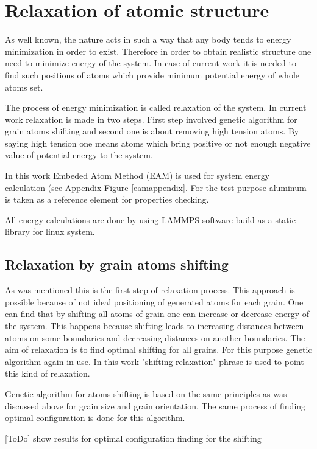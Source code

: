 \documentclass[12pt]{report}
\begin{document}
\section{Relaxation of atomic structure}

As well known, the nature acts in such a way that any body tends to energy minimization in order to exist. Therefore in order to obtain realistic structure one need to minimize energy of the system. In case of current work it is needed to find such positions of atoms which provide minimum potential energy of whole atoms set.

The process of energy minimization is called relaxation of the system. In current work relaxation is made in two steps. First step involved genetic algorithm for grain atoms shifting and second one is about removing high tension atoms. By saying high tension one means atoms which bring positive or not enough negative value of potential energy to the system.

In this work Embeded Atom Method (EAM) is used for system energy calculation (see Appendix Figure \ref{eamappendix}. For the test purpose aluminum is taken as a reference element for properties checking. 

All energy calculations are done by using LAMMPS software build as a static library for linux system.

\subsection{Relaxation by grain atoms shifting}

As was mentioned this is the first step of relaxation process. This approach is possible because of not ideal positioning of generated atoms for each grain. One can find that by shifting all atoms of grain one can increase or decrease energy of the system. This happens because shifting leads to increasing distances between atoms on some boundaries and decreasing distances on another boundaries. The aim of relaxation is to find optimal shifting for all grains. For this purpose genetic algorithm again in use. In this work "shifting relaxation" phrase is used to point this kind of relaxation.

Genetic algorithm for atoms shifting is based on the same principles as was discussed above for grain size and grain orientation. The same process of finding optimal configuration is done for this algorithm. 

[ToDo] show results for optimal configuration finding for the shifting
\end{document}
